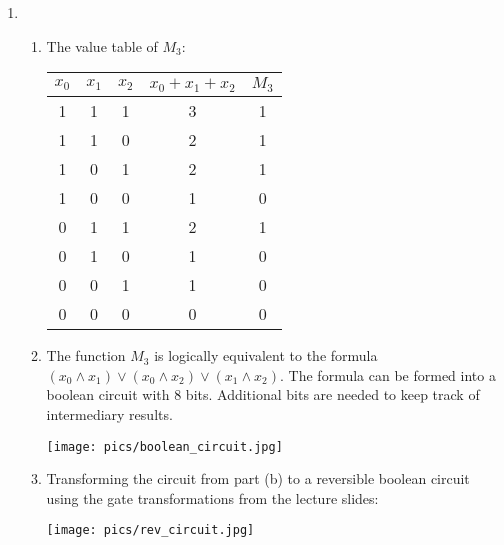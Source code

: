 \documentclass[11pt,a4paper]{article}
\begin{document}
\begin{enumerate}
    \item
          \begin{enumerate}
              \item The value table of $M_3$:
                    \begin{center}
                        \begin{tabular}{c|c|c|c|c}
                            $x_0$ & $x_1$ & $x_2$ & $x_0 + x_1 + x_2$ & $M_3$ \\
                            \hline
                            1     & 1     & 1     & 3                 & 1     \\
                            1     & 1     & 0     & 2                 & 1     \\
                            1     & 0     & 1     & 2                 & 1     \\
                            1     & 0     & 0     & 1                 & 0     \\
                            0     & 1     & 1     & 2                 & 1     \\
                            0     & 1     & 0     & 1                 & 0     \\
                            0     & 0     & 1     & 1                 & 0     \\
                            0     & 0     & 0     & 0                 & 0     \\
                        \end{tabular}
                    \end{center}
              \item The function $M_3$ is logically equivalent to the formula $(x_0 \land x_1) \lor (x_0 \land x_2) \lor (x_1 \land x_2)$. The formula can be formed into a boolean circuit
                    with 8 bits. Additional bits are needed to keep track of intermediary results.
                    \begin{center}
                        \texttt{[image: pics/boolean\_circuit.jpg]}
                    \end{center}
              \item Transforming the circuit from part (b) to a reversible boolean circuit using the gate transformations
                    from the lecture slides:
                    \begin{center}
                        \texttt{[image: pics/rev\_circuit.jpg]}
                    \end{center}

\end{enumerate}
\end{enumerate}
\end{document}

